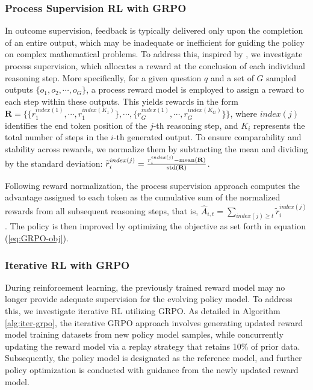 \begin{itemize}[topsep=0pt]
\begin{itemize}[topsep=0pt]
\subsubsection{Process Supervision RL with GRPO} 

In outcome supervision, feedback is typically delivered only upon the completion of an entire output, which may be inadequate or inefficient for guiding the policy on complex mathematical problems. To address this, inspired by \cite{wang2023math}, we investigate process supervision, which allocates a reward at the conclusion of each individual reasoning step. More specifically, for a given question $q$ and a set of $G$ sampled outputs $\{o_1, o_2, \cdots, o_G\}$, a process reward model is employed to assign a reward to each step within these outputs. This yields rewards in the form $\mathbf{R} = \{ \{r_1^{index(1)},\cdots,r_1^{index(K_1)}\}, \cdots,  \{r_G^{index(1)},\cdots,r_G^{index(K_G)}\} \}$, where $index(j)$ identifies the end token position of the $j$-th reasoning step, and $K_i$ represents the total number of steps in the $i$-th generated output. To ensure comparability and stability across rewards, we normalize them by subtracting the mean and dividing by the standard deviation: $\widetilde{r}_i^{index(j)} = \frac{r_i^{index(j)} - {\rm mean(\mathbf{R})}}{{\rm std(\mathbf{R})}}$.

Following reward normalization, the process supervision approach computes the advantage assigned to each token as the cumulative sum of the normalized rewards from all subsequent reasoning steps, that is, $\hat{A}_{i, t} = \sum_{index(j) \ge t} \widetilde{r}_i^{index(j)}$. The policy is then improved by optimizing the objective as set forth in equation (\ref{eq:GRPO-obj}).

\subsubsection{Iterative RL with GRPO} During reinforcement learning, the previously trained reward model may no longer provide adequate supervision for the evolving policy model. To address this, we investigate iterative RL utilizing GRPO. As detailed in Algorithm \ref{alg:iter-grpo}, the iterative GRPO approach involves generating updated reward model training datasets from new policy model samples, while concurrently updating the reward model via a replay strategy that retains 10\% of prior data. Subsequently, the policy model is designated as the reference model, and further policy optimization is conducted with guidance from the newly updated reward model.


\end{itemize}
\end{itemize}
